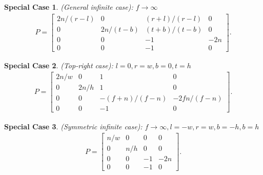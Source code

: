 \documentclass [12pt, a4paper] {article}
\newtheorem {specialcase} {Special Case}
\begin{document}
\begin {specialcase}
(General infinite case): $f\to\infty$
\begin {eqnarray}
    P
    =
    \begin {bmatrix}
        2n/(r-l) & 0 & (r+l)/(r-l) & 0 \\
        0 & 2n/(t-b) & (t+b)/(t-b) & 0 \\
        0 & 0 & -1 & -2n \\
        0 & 0 & -1 & 0
    \end {bmatrix}.
\end {eqnarray}
\end {specialcase}
\begin {specialcase}
(Top-right case): $l=0, r=w, b=0, t=h$
\begin {eqnarray}
    P
    =
    \begin {bmatrix}
        2n/w & 0 & 1 & 0 \\
        0 & 2n/h & 1 & 0 \\
        0 & 0 & -(f+n)/(f-n) & -2fn/(f-n) \\
        0 & 0 & -1 & 0
    \end {bmatrix}.
\end {eqnarray}
\end {specialcase}
\begin {specialcase}
(Symmetric infinite case): $f\to\infty, l=-w, r=w, b=-h, b=h$
\begin {eqnarray}
    \label{eq:syminfinite_proj}
    P
    =
    \begin {bmatrix}
        n/w & 0 & 0 & 0 \\
        0 & n/h & 0 & 0 \\
        0 & 0 & -1 & -2n \\
        0 & 0 & -1 & 0
    \end {bmatrix}.
\end {eqnarray}
\end {specialcase}
\end{document}

